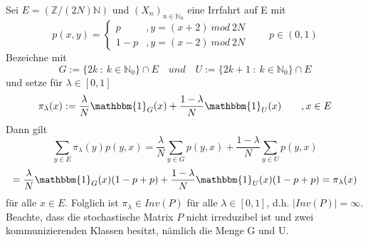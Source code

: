 Sei $E= (\mathbb{Z} / (2N)\mathbb{N})$ und $(X_{n})_{n \in \mathbb{N}_{0}}$ eine Irrfahrt auf E mit
\begin{equation*}
p(x,y)=
\begin{cases}
p & , y = (x+2) \: mod \: 2N  \\
1-p & , y = (x-2) \: mod \: 2N 
\end{cases} 
\qquad p \in (0,1)
\end{equation*}
Bezeichne mit
\begin{equation*}
G := \lbrace 2k \: : \: k \in \mathbb{N}_{0} \rbrace \cap E \quad und \quad U := \lbrace 2k +1 \: : \: k \in \mathbb{N}_{0} \rbrace \cap E
\end{equation*}
und setze für $\lambda \in [0,1]$
\begin{equation*}
\pi_{\lambda}(x) := \dfrac{\lambda}{N}\mathbbm{1}_{G}(x) + \dfrac{1-\lambda}{N}\mathbbm{1}_{U}(x) \qquad, x \in E
\end{equation*}
Dann gilt
\begin{equation*}
\sum_{y \in E} \pi_{\lambda}(y)p(y,x) = \dfrac{\lambda}{N} \sum_{y \in G} p(y,x) + \dfrac{1-\lambda}{N} \sum_{y \in U} p(y,x)
\end{equation*}
\begin{equation*}
= \dfrac{\lambda}{N}\mathbbm{1}_{G}(x)(1-p+p) + \dfrac{1-\lambda}{N}\mathbbm{1}_{U}(x)(1-p+p) = \pi_{\lambda}(x)
\end{equation*}
für alle $x \in E$. Folglich ist $\pi_{\lambda} \in Inv(P)$ für alle $\lambda \in [0,1]$, d.h. $\vert Inv(P) \vert = \infty$. Beachte, dass die stochastische Matrix $P$ nicht irreduzibel ist und zwei kommunizierenden Klassen besitzt, nämlich die Menge G und U.